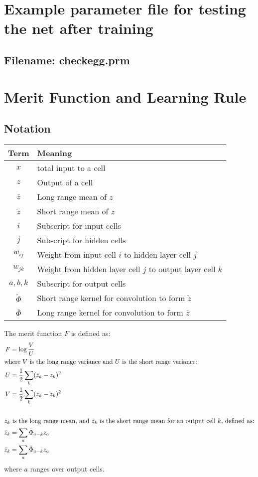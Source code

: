 \documentclass[a4paper]{article}
\newcommand{\zbar}{\bar{z}}
\newcommand{\ztilde}{\tilde{z}}
\newcommand{\lkernel}{\bar{\Phi}}
\newcommand{\skernel}{\tilde{\Phi}}
\begin{document}
\clearpage
\section{Example parameter file for testing the net after training}
\label{egcheck} 

\subsection*{Filename: checkegg.prm}



\section{Merit Function and Learning Rule}
\label{maths.app}

\subsection{Notation}

\begin{center}
  

\begin{tabular}{cp{8cm}}
  Term & Meaning \\ \hline
  $x$ & total input to a cell \\
  $z$ & Output of a cell \\
  $\zbar$ & Long range mean of $z$ \\
  $\ztilde$ & Short range mean of $z$ \\
  $i$ & Subscript for input cells \\
  $j$ & Subscript for hidden cells \\
  $w_{ij}$ & Weight from  input cell $i$ to hidden layer cell $j$\\
  $w_{jk}$ & Weight from  hidden layer cell $j$ to output layer cell $k$\\
  $a,b,k$ & Subscript for output cells \\
  $\skernel$ & Short range kernel for convolution to form $\ztilde$\\
  $\lkernel$ & Long range kernel for convolution to form $\zbar$\\

\end{tabular}
\end{center}

The merit function $F$ is defined as:
\begin{align*}
  F &= \log \frac{V}{U} \\ \intertext{where $V$ is the long range
    variance and $U$ is the short range variance:} U & = \frac{1}{2}
  \sum_k ( \ztilde_k - z_k ) ^2 \\ V & = \frac{1}{2} \sum_k ( \zbar_k
  - z_k ) ^2 \\ \\ \intertext{$\zbar_k$ is the long range mean, and
    $\ztilde_k$ is the short range mean for an output cell $k$,
    defined as:} \zbar_k &= \sum_a \lkernel_{a-k} z_a \\ \ztilde_k &=
  \sum_a \skernel_{a-k} z_a
\end{align*}
where $a$ ranges over output cells.
\end{document}
